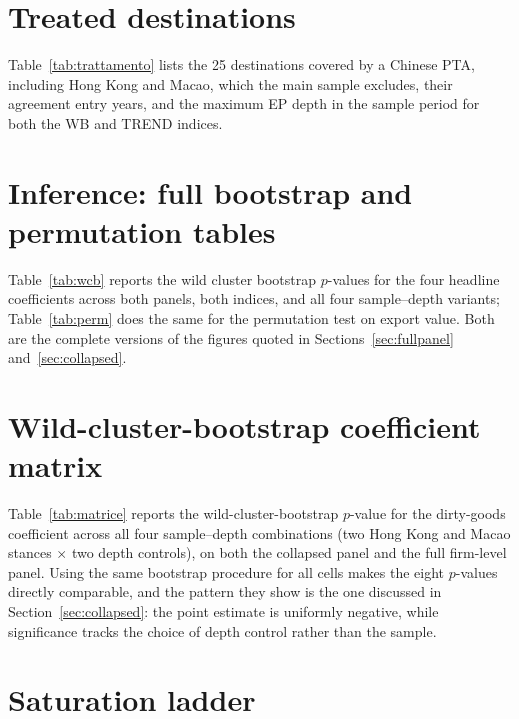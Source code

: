 \documentclass[12pt]{article}
\begin{document}
\section{Treated destinations}\label{app:trattamento}

Table~\ref{tab:trattamento} lists the 25 destinations covered by a Chinese PTA, including Hong Kong and Macao, which the main sample excludes, their agreement entry years, and the maximum EP depth in the sample period for both the WB and TREND indices.



\section{Inference: full bootstrap and permutation tables}\label{app:inference}

Table~\ref{tab:wcb} reports the wild cluster bootstrap $p$-values for the four headline
coefficients across both panels, both indices, and all four sample--depth variants;
Table~\ref{tab:perm} does the same for the permutation test on export value. Both are the
complete versions of the figures quoted in Sections~\ref{sec:fullpanel}
and~\ref{sec:collapsed}.





\section{Wild-cluster-bootstrap coefficient matrix}\label{app:matrice}

Table~\ref{tab:matrice} reports the wild-cluster-bootstrap $p$-value for the dirty-goods coefficient across all four sample--depth combinations (two Hong Kong and Macao stances $\times$ two depth controls), on both the collapsed panel and the full firm-level panel. Using the same bootstrap procedure for all cells makes the eight $p$-values directly comparable, and the pattern they show is the one discussed in Section~\ref{sec:collapsed}: the point estimate is uniformly negative, while significance tracks the choice of depth control rather than the sample.



\section{Saturation ladder}\label{app:ladder}
\end{document}
